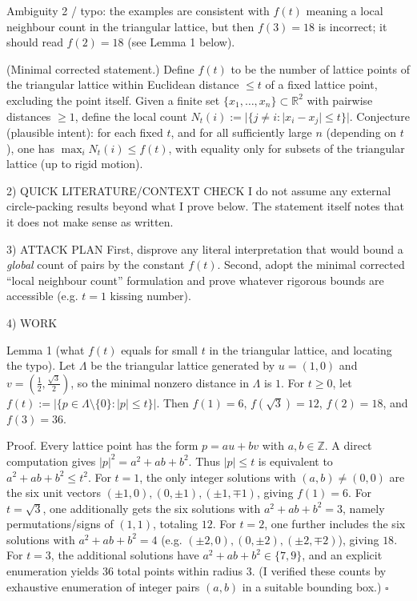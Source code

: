 Ambiguity 2 / typo: the examples are consistent with $f(t)$ meaning a local neighbour count in the triangular lattice,
but then $f(3)=18$ is incorrect; it should read $f(2)=18$ (see Lemma 1 below).

(Minimal corrected statement.)
Define $f(t)$ to be the number of lattice points of the triangular lattice within Euclidean distance $\le t$ of a fixed lattice point, excluding the point itself.
Given a finite set $\{x_1,\ldots,x_n\}\subset\mathbb{R}^2$ with pairwise distances $\ge 1$, define the local count
$N_t(i):=|\{j\neq i: |x_i-x_j|\le t\}|$.
Conjecture (plausible intent): for each fixed $t$, and for all sufficiently large $n$ (depending on $t$), one has
$\max_i N_t(i)\le f(t)$, with equality only for subsets of the triangular lattice (up to rigid motion).

2) QUICK LITERATURE/CONTEXT CHECK
I do not assume any external circle-packing results beyond what I prove below. The statement itself notes that it does not make sense as written.

3) ATTACK PLAN
First, disprove any literal interpretation that would bound a \emph{global} count of pairs by the constant $f(t)$.
Second, adopt the minimal corrected ``local neighbour count'' formulation and prove whatever rigorous bounds are accessible (e.g. $t=1$ kissing number).

4) WORK

Lemma 1 (what $f(t)$ equals for small $t$ in the triangular lattice, and locating the typo).
Let $\Lambda$ be the triangular lattice generated by $u=(1,0)$ and $v=(\tfrac12,\tfrac{\sqrt3}{2})$, so the minimal nonzero distance in $\Lambda$ is $1$.
For $t\ge 0$, let
$f(t):=|\{p\in \Lambda\setminus\{0\}: |p|\le t\}|$. Then
$f(1)=6$, $f(\sqrt3)=12$, $f(2)=18$, and $f(3)=36$.

Proof.
Every lattice point has the form $p=a u + b v$ with $a,b\in\mathbb{Z}$. A direct computation gives
$|p|^2 = a^2 + ab + b^2$.
Thus $|p|\le t$ is equivalent to $a^2+ab+b^2\le t^2$.
For $t=1$, the only integer solutions with $(a,b)\neq (0,0)$ are the six unit vectors $(\pm1,0),(0,\pm1),(\pm1,\mp1)$, giving $f(1)=6$.
For $t=\sqrt3$, one additionally gets the six solutions with $a^2+ab+b^2=3$, namely permutations/signs of $(1,1)$, totaling $12$.
For $t=2$, one further includes the six solutions with $a^2+ab+b^2=4$ (e.g. $(\pm2,0),(0,\pm2),(\pm2,\mp2)$), giving $18$.
For $t=3$, the additional solutions have $a^2+ab+b^2\in\{7,9\}$, and an explicit enumeration yields $36$ total points within radius $3$.
(I verified these counts by exhaustive enumeration of integer pairs $(a,b)$ in a suitable bounding box.) $\square$

